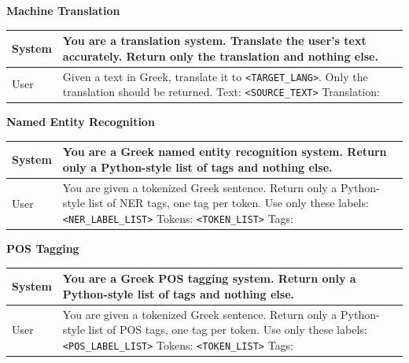 \documentclass[sigconf,review,anonymous]{acmart}
\begin{document}
\begin{center}
\textbf{Machine Translation}\par\smallskip
\small
\begin{tabularx}{\columnwidth}{p{}X}
\toprule
System & You are a translation system. Translate the user's text accurately. Return only the translation and nothing else. \\
\midrule
User & Given a text in Greek, translate it to \texttt{<TARGET\_LANG>}. Only the translation should be returned. \newline
Text: \texttt{<SOURCE\_TEXT>} \newline
Translation: \\
\bottomrule
\end{tabularx}
\end{center}

\begin{center}
\textbf{Named Entity Recognition}\par\smallskip
\small
\begin{tabularx}{\columnwidth}{p{}X}
\toprule
System & You are a Greek named entity recognition system. Return only a Python-style list of tags and nothing else. \\
\midrule
User & You are given a tokenized Greek sentence. Return only a Python-style list of NER tags, one tag per token. Use only these labels: \texttt{<NER\_LABEL\_LIST>} \newline
Tokens: \texttt{<TOKEN\_LIST>} \newline
Tags: \\
\bottomrule
\end{tabularx}
\end{center}

\begin{center}
\textbf{POS Tagging}\par\smallskip
\small
\begin{tabularx}{\columnwidth}{p{}X}
\toprule
System & You are a Greek POS tagging system. Return only a Python-style list of tags and nothing else. \\
\midrule
User & You are given a tokenized Greek sentence. Return only a Python-style list of POS tags, one tag per token. Use only these labels: \texttt{<POS\_LABEL\_LIST>} \newline
Tokens: \texttt{<TOKEN\_LIST>} \newline
Tags: \\
\bottomrule
\end{tabularx}
\end{center}
\end{document}
